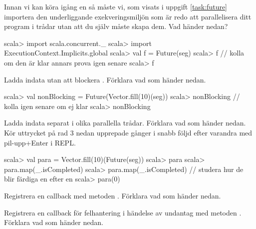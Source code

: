 \Subtask Innan vi kan köra igång en  så måste vi, som visats i uppgift \ref{task:future} importera den underliggande exekveringsmiljön som är redo att parallelisera ditt program i trådar utan att du själv måste skapa dem. Vad händer nedan?
\begin{REPL}
scala> import scala.concurrent._
scala> import ExecutionContext.Implicits.global
scala> val f = Future(seg)
scala> f   // kolla om den är klar annars prova igen senare
scala> f
\end{REPL}

\Subtask Ladda indata utan att blockera . Förklara vad som händer nedan.
\begin{REPL}
scala> val nonBlocking = Future(Vector.fill(10)(seg))
scala> nonBlocking   // kolla igen senare om ej klar
scala> nonBlocking
\end{REPL}

\Subtask Ladda indata separat i olika parallella trådar. Förklara vad som händer nedan. Kör uttrycket på rad 3 nedan upprepade gånger i snabb följd efter varandra med pil-upp+Enter i REPL.
\begin{REPL}
scala> val para = Vector.fill(10)(Future(seg))
scala> para
scala> para.map(_.isCompleted)
scala> para.map(_.isCompleted) // studera hur de blir färdiga en efter en
scala> para(0)
\end{REPL}

\Subtask Registrera en callback med metoden . Förklara vad som händer nedan.


\Subtask Registrera en callback för felhantering i händelse av undantag med metoden . Förklara vad som händer nedan.



\SOLUTION


\TaskSolved \what

